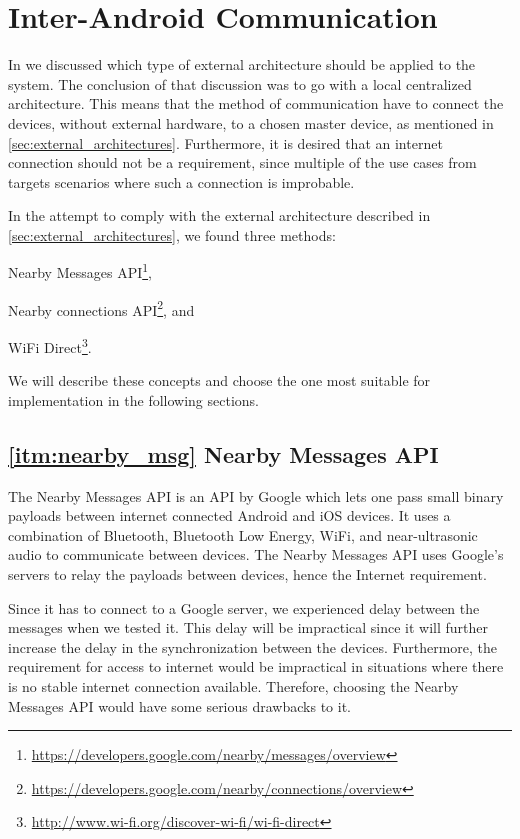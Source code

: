 \section{Inter-Android Communication}\label{sec:communication_methods}
In  we discussed which type of external architecture should be applied to the system.
The conclusion of that discussion was to go with a local centralized architecture.
This means that the method of communication have to connect the devices, without external hardware, to a chosen master device, as mentioned in \cref{sec:external_architectures}.
Furthermore, it is desired that an internet connection should not be a requirement, since multiple of the use cases from  targets scenarios where such a connection is improbable.

In the attempt to comply with the external architecture described in \cref{sec:external_architectures}, we found three methods:
\begin{enumberate*}
\item Nearby Messages API\footnote{\url{https://developers.google.com/nearby/messages/overview}},\label{itm:nearby_msg}
\item Nearby connections API\footnote{\url{https://developers.google.com/nearby/connections/overview}}, and\label{itm:nearby_conn}
\item WiFi Direct\footnote{\url{http://www.wi-fi.org/discover-wi-fi/wi-fi-direct}}.\label{itm:wifi_direct}
\end{enumberate*}
We will describe these concepts and choose the one most suitable for implementation in the following sections.

\subsection*{\ref{itm:nearby_msg} Nearby Messages API}
The Nearby Messages API is an API by Google which lets one pass small binary payloads between internet connected Android and iOS devices.
It uses a combination of Bluetooth, Bluetooth Low Energy, WiFi, and near-ultrasonic audio to communicate between devices.
The Nearby Messages API uses Google's servers to relay the payloads between devices, hence the Internet requirement.\cite{nearby_messages}

Since it has to connect to a Google server, we experienced delay between the messages when we tested it.
This delay will be impractical since it will further increase the delay in the synchronization between the devices.
Furthermore, the requirement for access to internet would be impractical in situations where there is no stable internet connection available.
Therefore, choosing the Nearby Messages API would have some serious drawbacks to it.


